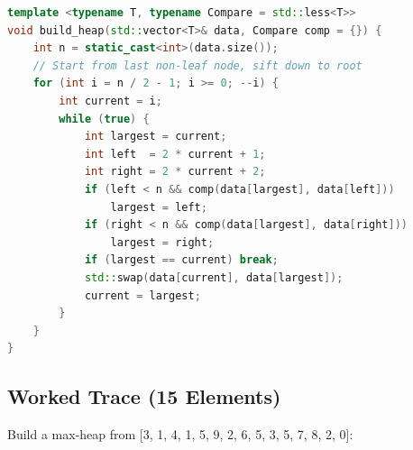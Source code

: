 \begin{lstlisting}[language=C++]
template <typename T, typename Compare = std::less<T>>
void build_heap(std::vector<T>& data, Compare comp = {}) {
    int n = static_cast<int>(data.size());
    // Start from last non-leaf node, sift down to root
    for (int i = n / 2 - 1; i >= 0; --i) {
        int current = i;
        while (true) {
            int largest = current;
            int left  = 2 * current + 1;
            int right = 2 * current + 2;
            if (left < n && comp(data[largest], data[left]))
                largest = left;
            if (right < n && comp(data[largest], data[right]))
                largest = right;
            if (largest == current) break;
            std::swap(data[current], data[largest]);
            current = largest;
        }
    }
}
\end{lstlisting}

\subsection{Worked Trace (15 Elements)}

Build a max-heap from [3, 1, 4, 1, 5, 9, 2, 6, 5, 3, 5, 7, 8, 2, 0]:

